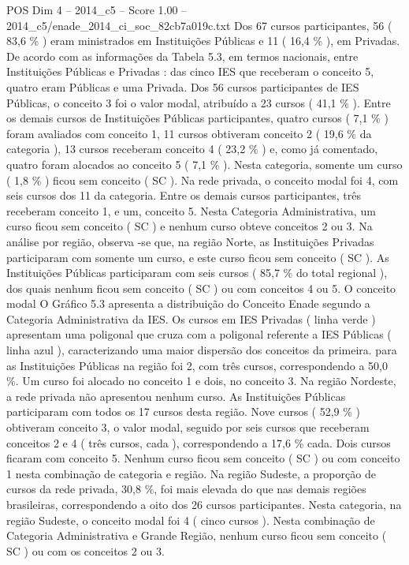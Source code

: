 \begin{textsample}{POS Dim 4 – 2014\_c5 – Score 1.00 – 2014\_c5/enade\_2014\_ci\_soc\_82cb7a019c.txt}
Dos 67 cursos participantes, 56 ( 83,6 \% ) eram ministrados em Instituições Públicas e 11 ( 16,4 \% ), em Privadas.
De acordo com as informações da Tabela 5.3, em termos nacionais, entre Instituições Públicas e Privadas : das cinco IES que receberam o conceito 5, quatro eram Públicas e uma Privada.
Dos 56 cursos participantes de IES Públicas, o conceito 3 foi o valor modal, atribuído a 23 cursos ( 41,1 \% ).
Entre os demais cursos de Instituições Públicas participantes, quatro cursos ( 7,1 \% ) foram avaliados com conceito 1, 11 cursos obtiveram conceito 2 ( 19,6 \% da categoria ), 13 cursos receberam conceito 4 ( 23,2 \% ) e, como já comentado, quatro foram alocados ao conceito 5 ( 7,1 \% ).
Nesta categoria, somente um curso ( 1,8 \% ) ficou sem conceito ( SC ).
Na rede privada, o conceito modal foi 4, com seis cursos dos 11 da categoria.
Entre os demais cursos participantes, três receberam conceito 1, e um, conceito 5.
Nesta Categoria Administrativa, um curso ficou sem conceito ( SC ) e nenhum curso obteve conceitos 2 ou 3.
Na análise por região, observa -se que, na região Norte, as Instituições Privadas participaram com somente um curso, e este curso ficou sem conceito ( SC ).
As Instituições Públicas participaram com seis cursos ( 85,7 \% do total regional ), dos quais nenhum ficou sem conceito ( SC ) ou com conceitos 4 ou 5.
O conceito modal O Gráfico 5.3 apresenta a distribuição do Conceito Enade segundo a Categoria Administrativa da IES.
Os cursos em IES Privadas ( linha verde ) apresentam uma poligonal que cruza com a poligonal referente a IES Públicas ( linha azul ), caracterizando uma maior dispersão dos conceitos da primeira. para as Instituições Públicas na região foi 2, com três cursos, correspondendo a 50,0 \%.
Um curso foi alocado no conceito 1 e dois, no conceito 3.
Na região Nordeste, a rede privada não apresentou nenhum curso.
As Instituições Públicas participaram com todos os 17 cursos desta região.
Nove cursos ( 52,9 \% ) obtiveram conceito 3, o valor modal, seguido por seis cursos que receberam conceitos 2 e 4 ( três cursos, cada ), correspondendo a 17,6 \% cada.
Dois cursos ficaram com conceito 5.
Nenhum curso ficou sem conceito ( SC ) ou com conceito 1 nesta combinação de categoria e região.
Na região Sudeste, a proporção de cursos da rede privada, 30,8 \%, foi mais elevada do que nas demais regiões brasileiras, correspondendo a oito dos 26 cursos participantes.
Nesta categoria, na região Sudeste, o conceito modal foi 4 ( cinco cursos ).
Nesta combinação de Categoria Administrativa e Grande Região, nenhum curso ficou sem conceito ( SC ) ou com os conceitos 2 ou 3.

\end{textsample}
